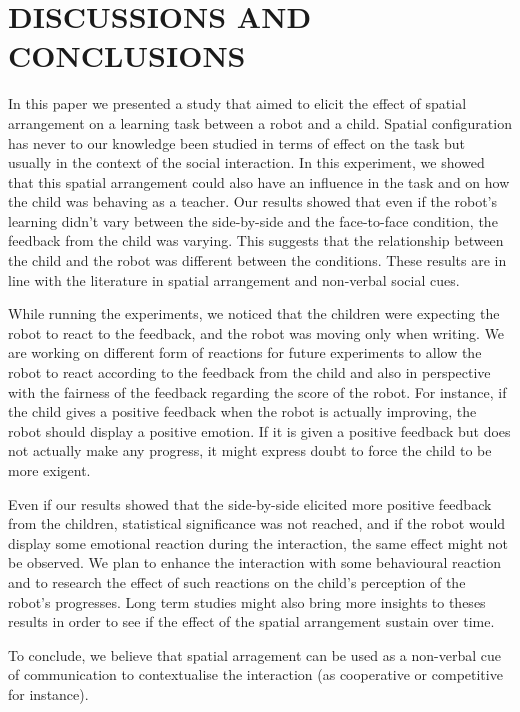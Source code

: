 \documentclass[letterpaper, 10 pt, conference]{ieeeconf}  %
\begin{document}
\section{DISCUSSIONS AND CONCLUSIONS}
In this paper we presented a study that aimed to elicit the effect of spatial arrangement on a learning task between a robot and a child.
Spatial configuration has never to our knowledge been studied in terms of effect on the task but usually in the context of the social interaction.
In this experiment, we showed that this spatial arrangement could also have an influence in the task and on how the child was behaving as a teacher.
Our results showed that even if the robot's learning didn't vary between the side-by-side and the face-to-face condition, the feedback from the child was varying.
This suggests that the relationship between the child and the robot was different between the conditions.
These results are in line with the literature in spatial arrangement and non-verbal social cues.

While running the experiments, we noticed that the children were expecting the robot to react to the feedback, and the robot was moving only when writing. 
We are working on different form of reactions for future experiments to allow the robot to react according to the feedback from the child and also in perspective with the fairness of the feedback regarding the score of the robot.
For instance, if the child gives a positive feedback when the robot is actually improving, the robot should display a positive emotion.
If it is given a positive feedback but does not actually make any progress, it might express doubt to force the child to be more exigent. 


Even if our results showed that the side-by-side elicited more positive feedback from the children, statistical significance was not reached, and if the robot would display some emotional reaction during the interaction, the same effect might not be observed. 
We plan to enhance the interaction with some behavioural reaction and to research the effect of such reactions on the child's perception of the robot's progresses. 
Long term studies might also bring more insights to theses results in order to see if the effect of the spatial arrangement sustain over time.

To conclude, we believe that spatial arragement can be used as a non-verbal cue of communication to contextualise the interaction (as cooperative or competitive for instance).
\end{document}

